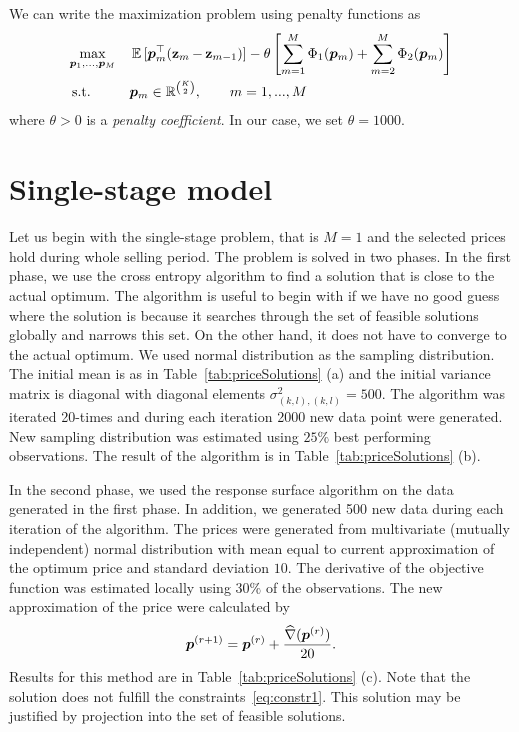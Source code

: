 We can write the maximization problem using penalty functions as
\begin{equation*}
	\begin{aligned}
		& \underset{\bm{p}_1, ..., \bm{p}_M}{\max} & & \operatorname{\mathbb{E}\,} [\bm{p}_{m}^{\top} (\operatorname{\mathbf{z}}_m - \operatorname{\mathbf{z}}_{m-1})] - \theta \left[ \sum_{m=1}^M \Phi_1 (\bm{p}_m) + \sum_{m=2}^M \Phi_2 (\bm{p}_m) \right] \\
		& \operatorname{\textrm{s.t.}} & & \bm{p}_m \in \mathbb{R}^{\binom{K}{2}}, \qquad m = 1, ..., M
	\end{aligned}
\end{equation*}
where $\theta > 0$ is a \emph{penalty coefficient}. In our case, we set $\theta = 1000$.




\section{Single-stage model}
	\label{chap:singleStageModel}

Let us begin with the single-stage problem, that is $M=1$ and the selected prices hold during whole selling period. The problem is solved in two phases. In the first phase, we use the cross entropy algorithm to find a solution that is close to the actual optimum. The algorithm is useful to begin with if we have no good guess where the solution is because it searches through the set of feasible solutions globally and narrows this set. On the other hand, it does not have to converge to the actual optimum. We used normal distribution as the sampling distribution. The initial mean is as in Table~\ref{tab:priceSolutions} (a) and the initial variance matrix is diagonal with diagonal elements $\sigma_{(k,l), (k,l)}^2 = 500$. The algorithm was iterated 20-times and during each iteration 2000 new data point were generated. New sampling distribution was estimated using $25\%$ best performing observations. The result of the algorithm is in Table~\ref{tab:priceSolutions} (b).

In the second phase, we used the response surface algorithm on the data generated in the first phase. In addition, we generated 500 new data during each iteration of the algorithm. The prices were generated from multivariate (mutually independent) normal distribution with mean equal to current approximation of the optimum price and standard deviation $10$. The derivative of the objective function was estimated locally using $30\%$ of the observations. The new approximation of the price were calculated by
\[
	\bm{p}^{(r+1)} = \bm{p}^{(r)} + \frac{\widehat{\nabla} (\bm{p}^{(r)})}{20}.
\]
Results for this method are in Table~\ref{tab:priceSolutions} (c). Note that the solution does not fulfill the constraints~\eqref{eq:constr1}. This solution may be justified by projection into the set of feasible solutions.

